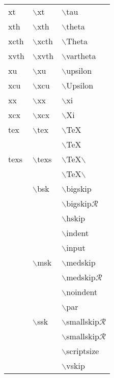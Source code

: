\begin{longtable}{p{20mm}p{20mm}p{65mm}}
xt & $\backslash$xt & $\backslash$tau\\
xth & $\backslash$xth & $\backslash$theta\\
xcth & $\backslash$xcth & $\backslash$Theta\\
xvth & $\backslash$xvth & $\backslash$vartheta\\
xu & $\backslash$xu & $\backslash$upsilon\\
xcu & $\backslash$xcu & $\backslash$Upsilon\\
xx & $\backslash$xx & $\backslash$xi\\
xcx & $\backslash$xcx & $\backslash$Xi\\
tex & $\backslash$tex & $\backslash$TeX\\
 &  & $\backslash$TeX\\
texs & $\backslash$texs & $\backslash$TeX$\backslash$ \\
 &  & $\backslash$TeX$\backslash$ \\
 & $\backslash$bsk & $\backslash$bigskip\\
 &  & $\backslash$bigskip$\mathcal{R}$\\
 &  & $\backslash$hskip\\
 &  & $\backslash$indent\\
 &  & $\backslash$input\\
 & $\backslash$msk & $\backslash$medskip\\
 &  & $\backslash$medskip$\mathcal{R}$\\
 &  & $\backslash$noindent\\
 &  & $\backslash$par\\
 & $\backslash$ssk & $\backslash$smallskip$\mathcal{R}$\\
 &  & $\backslash$smallskip$\mathcal{R}$\\
 &  & $\backslash$scriptsize\\
 &  & $\backslash$vskip\\
\end{longtable}
\rmfamily